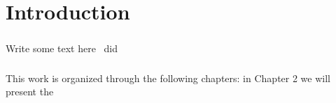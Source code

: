 \chapter{Introduction}
\paragraph{}
Write some text here~\cite{kundu2018namanda} did

\paragraph{}
This work is organized through the following chapters: in Chapter 2 we will present the 


